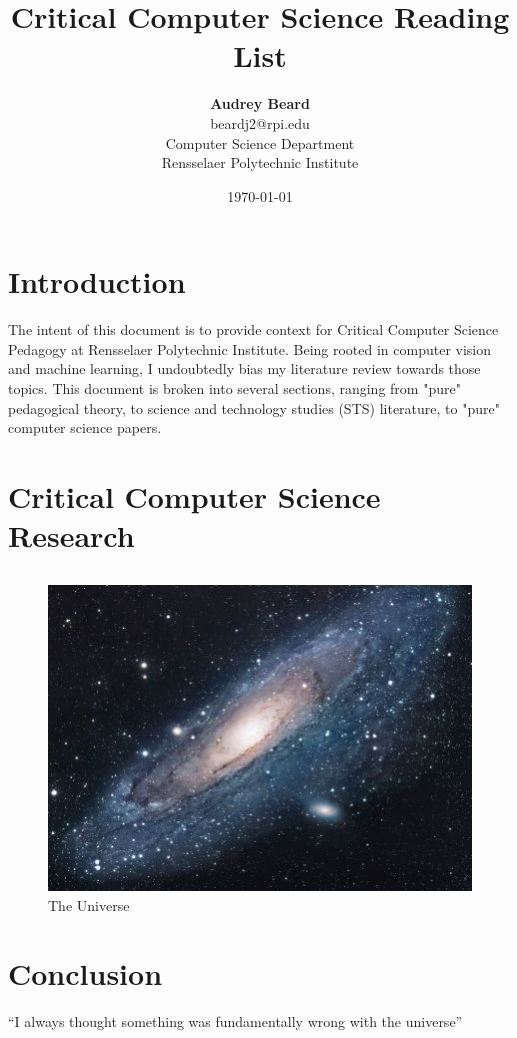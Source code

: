 \documentclass{article}
\title{Critical Computer Science Reading List}
\author{\textbf{Audrey Beard} \\
        beardj2@rpi.edu \\
        Computer Science Department \\
        Rensselaer Polytechnic Institute}
\date{\today}
\begin{document}
\maketitle

\section{Introduction}
The intent of this document is to provide context for Critical Computer Science Pedagogy at Rensselaer Polytechnic Institute.
Being rooted in computer vision and machine learning, I undoubtedly bias my literature review towards those topics.
This document is broken into several sections, ranging from "pure" pedagogical theory, to science and technology studies (STS) literature, to "pure" computer science papers.

\section{Critical Computer Science Research}
\subsection{}

\begin{figure}[h!]
\centering
\includegraphics[scale=1.7]{universe}
\caption{The Universe}
\label{fig:universe}
\end{figure}

\section{Conclusion}
``I always thought something was fundamentally wrong with the universe'' \citep{adams1995hitchhiker}



\end{document}
